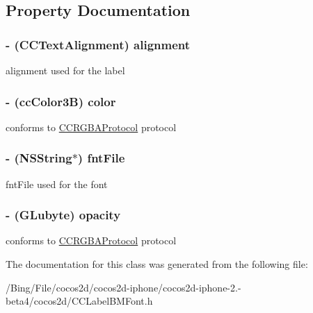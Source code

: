 \subsection{Property Documentation}
\hypertarget{interface_c_c_label_b_m_font_a09044cb69cc77f6a9c2eca4be57145ad}{
\subsubsection[{alignment}]{\setlength{\rightskip}{0pt plus 5cm}-\/ ({\bf C\-C\-Text\-Alignment}) {\bf alignment}}}\label{interface_c_c_label_b_m_font_a09044cb69cc77f6a9c2eca4be57145ad}
alignment used for the label \hypertarget{interface_c_c_label_b_m_font_ad23edd9d62b78b5f0c7844d8f5e9bb8b}{
\subsubsection[{color}]{\setlength{\rightskip}{0pt plus 5cm}-\/ ({\bf cc\-Color3\-B}) {\bf color}}}\label{interface_c_c_label_b_m_font_ad23edd9d62b78b5f0c7844d8f5e9bb8b}
conforms to \hyperlink{protocol_c_c_r_g_b_a_protocol-p}{C\-C\-R\-G\-B\-A\-Protocol} protocol \hypertarget{interface_c_c_label_b_m_font_a6e9e9cb1489af865f014c740eb18681e}{
\subsubsection[{fnt\-File}]{\setlength{\rightskip}{0pt plus 5cm}-\/ (N\-S\-String$\ast$) {\bf fnt\-File}}}\label{interface_c_c_label_b_m_font_a6e9e9cb1489af865f014c740eb18681e}
fnt\-File used for the font \hypertarget{interface_c_c_label_b_m_font_a7be6d42174b0e4f580de73ec7a1f0d35}{
\subsubsection[{opacity}]{\setlength{\rightskip}{0pt plus 5cm}-\/ (G\-Lubyte) {\bf opacity}}}\label{interface_c_c_label_b_m_font_a7be6d42174b0e4f580de73ec7a1f0d35}
conforms to \hyperlink{protocol_c_c_r_g_b_a_protocol-p}{C\-C\-R\-G\-B\-A\-Protocol} protocol 

The documentation for this class was generated from the following file\-:\begin{DoxyCompactItemize}
\item 
/\-Bing/\-File/cocos2d/cocos2d-\/iphone/cocos2d-\/iphone-\/2.-\/beta4/cocos2d/C\-C\-Label\-B\-M\-Font.\-h\end{DoxyCompactItemize}
